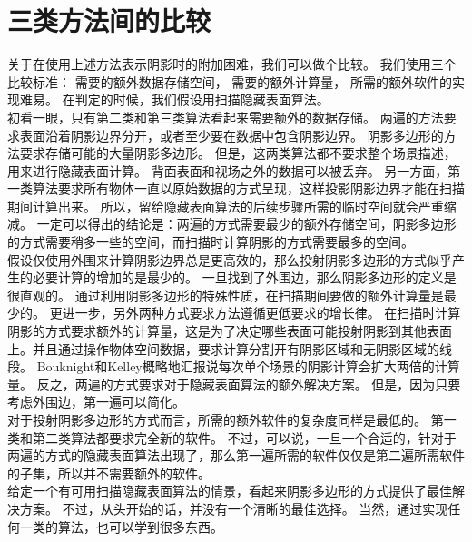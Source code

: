 \section{三类方法间的比较}
关于在使用上述方法表示阴影时的附加困难，我们可以做个比较。
我们使用三个比较标准：
需要的额外数据存储空间，
需要的额外计算量，
所需的额外软件的实现难易。
在判定的时候，我们假设用扫描隐藏表面算法。\\
初看一眼，只有第二类和第三类算法看起来需要额外的数据存储。
两遍的方法要求表面沿着阴影边界分开，或者至少要在数据中包含阴影边界。
阴影多边形的方法要求存储可能的大量阴影多边形。
但是，这两类算法都不要求整个场景描述，用来进行隐藏表面计算。
背面表面和视场之外的数据可以被丢弃。
另一方面，第一类算法要求所有物体一直以原始数据的方式呈现，这样投影阴影边界才能在扫描期间计算出来。
所以，留给隐藏表面算法的后续步骤所需的临时空间就会严重缩减。
一定可以得出的结论是：两遍的方式需要最少的额外存储空间，阴影多边形的方式需要稍多一些的空间，而扫描时计算阴影的方式需要最多的空间。\\
假设仅使用外围来计算阴影边界总是更高效的，那么投射阴影多边形的方式似乎产生的必要计算的增加的是最少的。
一旦找到了外围边，那么阴影多边形的定义是很直观的。
通过利用阴影多边形的特殊性质，在扫描期间要做的额外计算量是最少的。
更进一步，另外两种方式要求方法遵循更低要求的增长律。
在扫描时计算阴影的方式要求额外的计算量，这是为了决定哪些表面可能投射阴影到其他表面上。并且通过操作物体空间数据，要求计算分割开有阴影区域和无阴影区域的线段。
Bouknight和Kelley概略地汇报说每次单个场景的阴影计算会扩大两倍的计算量。
反之，两遍的方式要求对于隐藏表面算法的额外解决方案。
但是，因为只要考虑外围边，第一遍可以简化。\\
对于投射阴影多边形的方式而言，所需的额外软件的复杂度同样是最低的。
第一类和第二类算法都要求完全新的软件。
不过，可以说，一旦一个合适的，针对于两遍的方式的隐藏表面算法出现了，那么第一遍所需的软件仅仅是第二遍所需软件的子集，所以并不需要额外的软件。\\
给定一个有可用扫描隐藏表面算法的情景，看起来阴影多边形的方式提供了最佳解决方案。
不过，从头开始的话，并没有一个清晰的最佳选择。
当然，通过实现任何一类的算法，也可以学到很多东西。